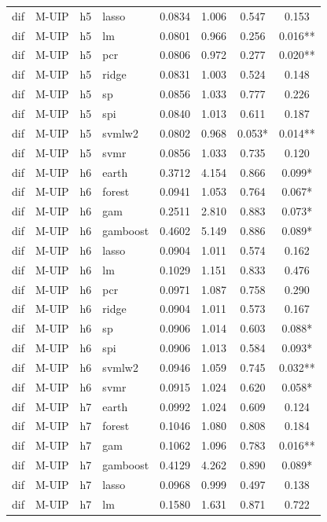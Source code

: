 \begin{ThreePartTable}
\begin{longtable}[t]{llclcccc}
dif & M-UIP & h5 & lasso & 0.0834 & 1.006 & 0.547 & 0.153\\
dif & M-UIP & h5 & lm & 0.0801 & 0.966 & 0.256 & 0.016**\\
dif & M-UIP & h5 & pcr & 0.0806 & 0.972 & 0.277 & 0.020**\\
dif & M-UIP & h5 & ridge & 0.0831 & 1.003 & 0.524 & 0.148\\
dif & M-UIP & h5 & sp & 0.0856 & 1.033 & 0.777 & 0.226\\
dif & M-UIP & h5 & spi & 0.0840 & 1.013 & 0.611 & 0.187\\
dif & M-UIP & h5 & svmlw2 & 0.0802 & 0.968 & 0.053* & 0.014**\\
dif & M-UIP & h5 & svmr & 0.0856 & 1.033 & 0.735 & 0.120\\
\addlinespace
dif & M-UIP & h6 & earth & 0.3712 & 4.154 & 0.866 & 0.099*\\
dif & M-UIP & h6 & forest & 0.0941 & 1.053 & 0.764 & 0.067*\\
dif & M-UIP & h6 & gam & 0.2511 & 2.810 & 0.883 & 0.073*\\
dif & M-UIP & h6 & gamboost & 0.4602 & 5.149 & 0.886 & 0.089*\\
dif & M-UIP & h6 & lasso & 0.0904 & 1.011 & 0.574 & 0.162\\
dif & M-UIP & h6 & lm & 0.1029 & 1.151 & 0.833 & 0.476\\
dif & M-UIP & h6 & pcr & 0.0971 & 1.087 & 0.758 & 0.290\\
dif & M-UIP & h6 & ridge & 0.0904 & 1.011 & 0.573 & 0.167\\
dif & M-UIP & h6 & sp & 0.0906 & 1.014 & 0.603 & 0.088*\\
dif & M-UIP & h6 & spi & 0.0906 & 1.013 & 0.584 & 0.093*\\
dif & M-UIP & h6 & svmlw2 & 0.0946 & 1.059 & 0.745 & 0.032**\\
dif & M-UIP & h6 & svmr & 0.0915 & 1.024 & 0.620 & 0.058*\\
\addlinespace
dif & M-UIP & h7 & earth & 0.0992 & 1.024 & 0.609 & 0.124\\
dif & M-UIP & h7 & forest & 0.1046 & 1.080 & 0.808 & 0.184\\
dif & M-UIP & h7 & gam & 0.1062 & 1.096 & 0.783 & 0.016**\\
dif & M-UIP & h7 & gamboost & 0.4129 & 4.262 & 0.890 & 0.089*\\
dif & M-UIP & h7 & lasso & 0.0968 & 0.999 & 0.497 & 0.138\\
dif & M-UIP & h7 & lm & 0.1580 & 1.631 & 0.871 & 0.722\\

\end{longtable}
\end{ThreePartTable}
